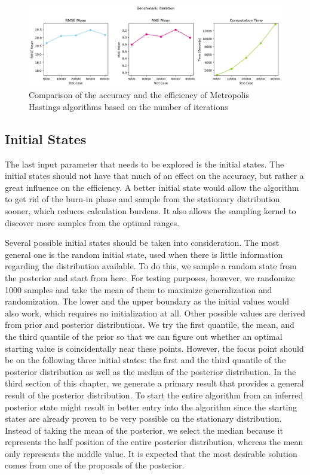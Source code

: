 \begin{figure}[H]
    \centering
    \includegraphics[width=1\textwidth]{figures/basic_mh/benchmark/iteration.png}
    \captionsetup{width=.8\textwidth}
    \caption{Comparison of the accuracy and the efficiency of Metropolis Hastings algorithms based on the number of iterations}
    \label{fig:enter-label}
\end{figure}


\subsection{Initial States}
The last input parameter that needs to be explored is the initial states. The initial states should not have that much of an effect on the accuracy, but rather a great influence on the efficiency.\cite{mcmc_practice} A better initial state would allow the algorithm to get rid of the burn-in phase and sample from the stationary distribution sooner, which reduces calculation burdens. It also allows the sampling kernel to discover more samples from the optimal ranges.

Several possible initial states should be taken into consideration. The most general one is the random initial state, used when there is little information regarding the distribution available. To do this, we sample a random state from the posterior and start from here. For testing purposes, however, we randomize 1000 samples and take the mean of them to maximize generalization and randomization. The lower and the upper boundary as the initial values would also work, which requires no initialization at all. Other possible values are derived from prior and posterior distributions. We try the first quantile, the mean, and the third quantile of the prior so that we can figure out whether an optimal starting value is coincidentally near these points. However, the focus point should be on the following three initial states: the first and the third quantile of the posterior distribution as well as the median of the posterior distribution. In the third section of this chapter, we generate a primary result that provides a general result of the posterior distribution. To start the entire algorithm from an inferred posterior state might result in better entry into the algorithm since the starting states are already proven to be very possible on the stationary distribution. Instead of taking the mean of the posterior, we select the median because it represents the half position of the entire posterior distribution, whereas the mean only represents the middle value. It is expected that the most desirable solution comes from one of the proposals of the posterior.

